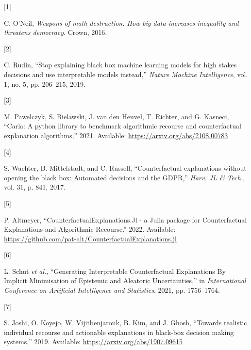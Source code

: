 \documentclass[conference,final,]{IEEEtran}
\newlength{\cslhangindent}
\newlength{\csllabelwidth}
\newlength{\cslentryspacingunit} %
\newenvironment{CSLReferences}[2] %
 {%
  \setlength{\parindent}{0pt}
  \ifodd #1
  \let\oldpar\par
  \def\par{\hangindent=\cslhangindent\oldpar}
  \fi
  \setlength{\parskip}{#2\cslentryspacingunit}
 }%
 {}
\newcommand{\CSLLeftMargin}[1]{\parbox[t]{\csllabelwidth}{#1}}
\newcommand{\CSLRightInline}[1]{\parbox[t]{\linewidth - \csllabelwidth}{#1}\break}
\theoremstyle{definition}
\theoremstyle{definition}
\theoremstyle{definition}
\theoremstyle{definition}
\theoremstyle{remark}
\begin{document}
\hypertarget{refs}{}
\begin{CSLReferences}{0}{0}
\leavevmode{}%
\CSLLeftMargin{{[}1{]} }%
\CSLRightInline{C. O'Neil, \emph{Weapons of math destruction: {How} big data increases inequality and threatens democracy}. {Crown}, 2016.}

\leavevmode{}%
\CSLLeftMargin{{[}2{]} }%
\CSLRightInline{C. Rudin, {``Stop explaining black box machine learning models for high stakes decisions and use interpretable models instead,''} \emph{Nature Machine Intelligence}, vol. 1, no. 5, pp. 206--215, 2019.}

\leavevmode{}%
\CSLLeftMargin{{[}3{]} }%
\CSLRightInline{M. Pawelczyk, S. Bielawski, J. van den Heuvel, T. Richter, and G. Kasneci, {``Carla: {A} python library to benchmark algorithmic recourse and counterfactual explanation algorithms,''} 2021. Available: \url{https://arxiv.org/abs/2108.00783}}

\leavevmode{}%
\CSLLeftMargin{{[}4{]} }%
\CSLRightInline{S. Wachter, B. Mittelstadt, and C. Russell, {``Counterfactual explanations without opening the black box: {Automated} decisions and the {GDPR},''} \emph{Harv. JL \& Tech.}, vol. 31, p. 841, 2017.}

\leavevmode{}%
\CSLLeftMargin{{[}5{]} }%
\CSLRightInline{P. Altmeyer, {``{CounterfactualExplanations}.{Jl} - a {Julia} package for {Counterfactual Explanations} and {Algorithmic Recourse}.''} 2022. Available: \url{https://github.com/pat-alt/CounterfactualExplanations.jl}}

\leavevmode{}%
\CSLLeftMargin{{[}6{]} }%
\CSLRightInline{L. Schut \emph{et al.}, {``Generating {Interpretable Counterfactual Explanations By Implicit Minimisation} of {Epistemic} and {Aleatoric Uncertainties},''} in \emph{International {Conference} on {Artificial Intelligence} and {Statistics}}, 2021, pp. 1756--1764.}

\leavevmode{}%
\CSLLeftMargin{{[}7{]} }%
\CSLRightInline{S. Joshi, O. Koyejo, W. Vijitbenjaronk, B. Kim, and J. Ghosh, {``Towards realistic individual recourse and actionable explanations in black-box decision making systems,''} 2019. Available: \url{https://arxiv.org/abs/1907.09615}}


\end{CSLReferences}
\end{document}
